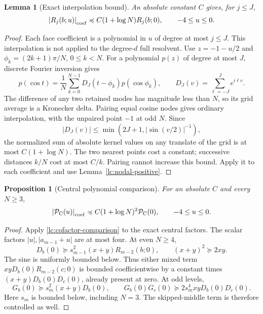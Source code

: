 \documentclass[11pt]{article}
\numberwithin{equation}{section}
\newtheorem{proposition}[theorem]{Proposition}
\newtheorem{lemma}[theorem]{Lemma}
\theoremstyle{remark}\newtheorem{remark}[theorem]{Remark}
\newcommand{\coefle}{\preccurlyeq}
\newcommand{\coefge}{\succcurlyeq}
\newcommand{\abscoef}[1]{\left|#1\right|_{\rm coef}}
\begin{document}
\begin{lemma}[Exact interpolation bound]\label{lc:interpolation}
An absolute constant \(C\) gives, for \(j\le J\),
\begin{equation}\label{lc:cofactor-comparison}
 \abscoef{R_j(b;u)}\coefle C(1+\log N)R_j(b;0),\qquad -4\le u\le0.
\end{equation}
\end{lemma}
\begin{proof}
Each face coefficient is a polynomial in \(u\) of degree at most
\(j\le J\). This interpolation is not applied to the degree-\(d\)
full resolvent. Use \(z=-1-u/2\) and
\(\phi_k=(2k+1)\pi/N\), \(0\le k<N\).
For a polynomial \(p(z)\) of degree at most \(J\), discrete Fourier
inversion gives
\[
 p(\cos t)=\frac1N\sum_{k=0}^{N-1}D_J(t-\phi_k)p(\cos\phi_k),
 \qquad D_J(v)=\sum_{\ell=-J}^Je^{i\ell v}.
\]
The difference of any two retained modes has magnitude less than \(N\),
so its grid average is a Kronecker delta. Pairing equal cosine nodes
gives ordinary interpolation, with the unpaired point \(-1\) at odd \(N\).
Since
\[
 |D_J(v)|\le\min(2J+1,|\sin(v/2)|^{-1}),
\]
the normalized sum of absolute kernel values on any translate of the
grid is at most \(C(1+\log N)\). The two nearest points cost a constant;
successive distances \(k/N\) cost at most \(C/k\). Pairing cannot
increase this bound. Apply it to each coefficient and use
Lemma~\ref{lc:nodal-positive}.
\end{proof}

\begin{proposition}[Central polynomial comparison]\label{lc:central-comparison}
For an absolute \(C\) and every \(N\ge3\),
\begin{equation}\label{lc:central-coefficientwise}
 \abscoef{\mathcal P_{\mathrm C}(u)}
 \coefle C(1+\log N)^2\mathcal P_{\mathrm C}(0),\qquad -4\le u\le0.
\end{equation}
\end{proposition}
\begin{proof}
Apply \eqref{lc:cofactor-comparison} to the exact central factors.
The scalar factors \(|u|,|a_{m-1}+u|\) are at most four.
At even \(N\ge4\),
\[
 D_b(0)\coefge s_{m-1}^2(x+y)R_{m-2}(b;0),\qquad (x+y)^2\coefge2xy.
\]
The sine is uniformly bounded below. Thus either mixed term
\(xyD_b(0)R_{m-2}(c;0)\) is bounded coefficientwise by a constant
times \((x+y)D_b(0)D_c(0)\), already present at zero.
At odd levels,
\[
 G_b(0)\coefge s_m^2(x+y)D_b(0),\qquad
 G_b(0)G_c(0)\coefge2s_m^4xyD_b(0)D_c(0).
\]
Here \(s_m\) is bounded below, including \(N=3\).
The skipped-middle term is therefore controlled as well.
\end{proof}
\end{document}
